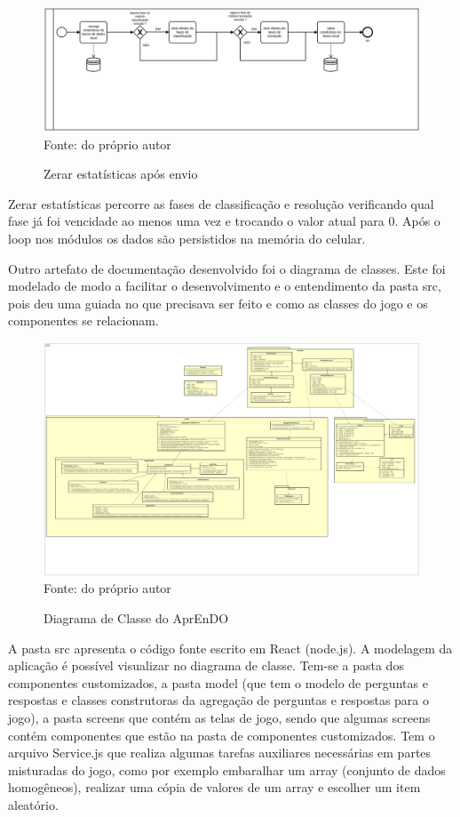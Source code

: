 \begin{figure}[H]
\centering
\caption{Zerar estatísticas após envio}
\includegraphics[width=\textwidth,height=\textheight,keepaspectratio]{figuras/processos/processo_zerar_estatisticas.png}
\label{zerar_estatisticas}
\small{Fonte: do próprio autor}
\end{figure}

Zerar estatísticas percorre as fases de classificação e resolução verificando qual fase já foi vencidade ao menos uma vez e trocando o valor atual para 0. Após o loop nos módulos os dados são persistidos na memória do celular.

Outro artefato de documentação desenvolvido foi o diagrama de classes. Este foi modelado de modo a facilitar o desenvolvimento e o entendimento da pasta src, pois deu uma guiada no que precisava ser feito e como as classes do jogo e os componentes se relacionam. 

\begin{figure}[H]
\centering
\caption{Diagrama de Classe do AprEnDO}
\includegraphics[width=\textwidth,height=\textheight,keepaspectratio]{figuras/DC_novo2.png}
\small{Fonte: do próprio autor}
\end{figure}

A pasta src apresenta o código fonte escrito em React (node.js).
A modelagem da aplicação é possível visualizar no diagrama de classe. Tem-se a pasta dos componentes customizados, a pasta model (que tem o modelo de perguntas e respostas e classes construtoras da agregação de perguntas e respostas para o jogo),  a pasta screens que contém as telas de jogo, sendo que algumas screens contém componentes que estão na pasta de componentes customizados. Tem o arquivo Service.js que realiza algumas tarefas auxiliares necessárias em partes misturadas do jogo, como por exemplo embaralhar um array (conjunto de dados homogêneos), realizar uma cópia de valores de um array e escolher um item aleatório.

